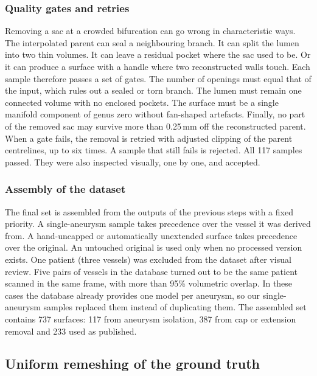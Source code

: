 \subsubsection*{Quality gates and retries}

Removing a sac at a crowded bifurcation can go wrong in characteristic ways. The interpolated parent can seal a neighbouring branch. It can split the lumen into two thin volumes. It can leave a residual pocket where the sac used to be. Or it can produce a surface with a handle where two reconstructed walls touch. Each sample therefore passes a set of gates. The number of openings must equal that of the input, which rules out a sealed or torn branch. The lumen must remain one connected volume with no enclosed pockets. The surface must be a single manifold component of genus zero without fan-shaped artefacts. Finally, no part of the removed sac may survive more than 0.25\,mm off the reconstructed parent. When a gate fails, the removal is retried with adjusted clipping of the parent centrelines, up to six times. A sample that still fails is rejected. All 117 samples passed. They were also inspected visually, one by one, and accepted.

\subsubsection*{Assembly of the dataset}

The final set is assembled from the outputs of the previous steps with a fixed priority. A single-aneurysm sample takes precedence over the vessel it was derived from. A hand-uncapped or automatically unextended surface takes precedence over the original. An untouched original is used only when no processed version exists. One patient (three vessels) was excluded from the dataset after visual review. Five pairs of vessels in the database turned out to be the same patient scanned in the same frame, with more than 95\% volumetric overlap. In these cases the database already provides one model per aneurysm, so our single-aneurysm samples replaced them instead of duplicating them. The assembled set contains 737 surfaces: 117 from aneurysm isolation, 387 from cap or extension removal and 233 used as published.

\subsection{Uniform remeshing of the ground truth}
\label{sec:dp_remesh}

